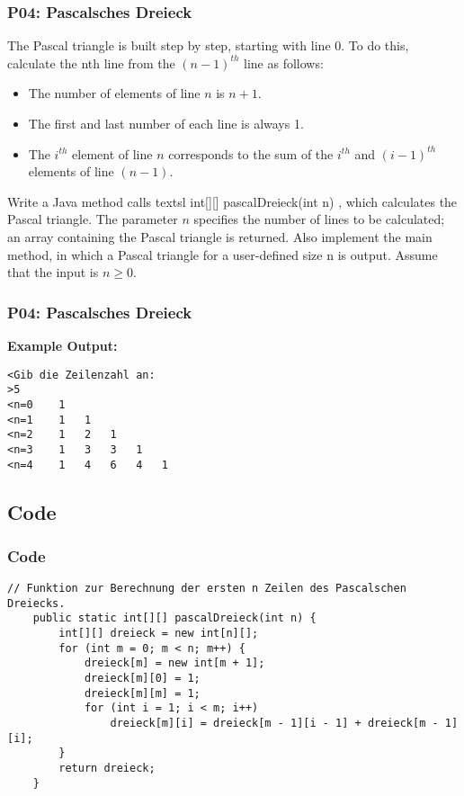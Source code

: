 \documentclass[handout, navsym]{tum-presentation}
\numberwithin{equation}{section}
\begin{document}
 
\begin{frame}[fragile]
\frametitle{P04: Pascalsches Dreieck}
\vspace*{\fill} \large

The Pascal triangle is built step by step, starting with line 0. To do this, calculate the nth line from the $(n - 1)^{th}$ line as follows:\par
\begin{itemize}
	\item The number of elements of line $n$ is $n + 1$.
	\item The first and last number of each line is always 1.
	\item The $i^{th}$ element of line $n$ corresponds to the sum of the $i^{th}$ and $(i-1)^{th}$ elements of line $(n - 1)$.
\end{itemize}
Write a Java method calls textsl{ \color{red}int[][] pascalDreieck(int n)} , which calculates the Pascal triangle. The parameter $n$ specifies the number of lines to be calculated; an array containing the Pascal triangle is returned. Also implement the main method, in which a Pascal triangle for a user-defined size n is output. Assume that the input is $n \ge 0$.\par
\vspace*{\fill}
\end{frame}

\begin{frame}[fragile]
\frametitle{P04: Pascalsches Dreieck}
\vspace*{\fill}
\textbf{\large Example Output:}
\begin{lstlisting}
<Gib die Zeilenzahl an:
>5
<n=0    1
<n=1    1   1
<n=2    1   2   1
<n=3    1   3   3   1
<n=4    1   4   6   4   1
\end{lstlisting}

\vspace*{\fill}
\end{frame}

\subsection{Code}
\begin{frame}[fragile]
\frametitle{Code}
\vspace*{\fill}
\center
\begin{lstlisting}
// Funktion zur Berechnung der ersten n Zeilen des Pascalschen Dreiecks.
    public static int[][] pascalDreieck(int n) {
        int[][] dreieck = new int[n][];
        for (int m = 0; m < n; m++) {
            dreieck[m] = new int[m + 1];
            dreieck[m][0] = 1;
            dreieck[m][m] = 1;
            for (int i = 1; i < m; i++)
                dreieck[m][i] = dreieck[m - 1][i - 1] + dreieck[m - 1][i];
        }
        return dreieck;
    }

\end{lstlisting}
\vspace*{\fill}
\end{frame}
\end{document}
